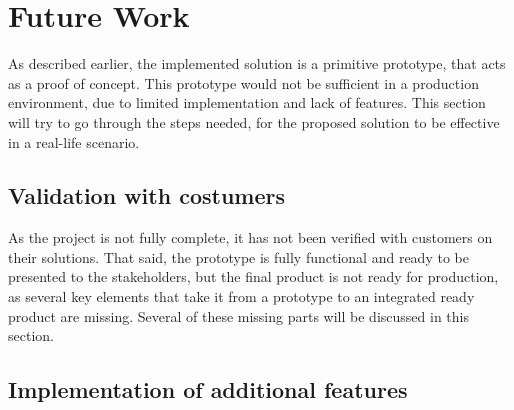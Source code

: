 \section{Future Work}
As described earlier, the implemented solution is a primitive prototype, that acts as a proof of concept. This prototype would not be sufficient in a production environment, due to limited implementation and lack of features. This section will try to go through the steps needed, for the proposed solution to be effective in a real-life scenario.
\subsection{Validation with costumers}
As the project is not fully complete, it has not been verified with customers on their solutions.
That said, the prototype is fully functional and ready to be presented to the stakeholders, but the final product is not ready for production, as several key elements that take it from a prototype to an integrated ready product are missing. Several of these missing parts will be discussed in this section.


\subsection{Implementation of additional features}
